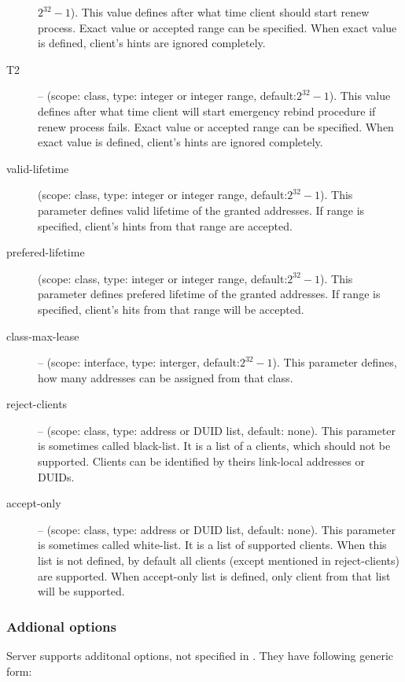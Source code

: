 \begin{description}
            $2^{32}-1$). This value
	    defines after what time client should start renew
	    process. Exact value or accepted range can be
            specified. When exact value is defined, client's hints are
            ignored completely. 
 \item[T2] -- (scope: class, type: integer or integer range, default:$2^{32}-1$). This value
	    defines after what time client will start emergency rebind
	    procedure if renew process fails. Exact value or accepted range can be
            specified. When exact value is defined, client's hints are
            ignored completely.
\item[valid-lifetime] (scope: class, type: integer or integer range,
	    default:$2^{32}-1$). This parameter defines valid lifetime of
	    the granted addresses. If range is specified, client's
            hints from that range are accepted.
\item[prefered-lifetime] (scope: class, type: integer or integer range,
	    default:$2^{32}-1$). This parameter defines prefered
            lifetime of the granted addresses. If range is specified,
            client's hits from that range will be accepted.
\item[class-max-lease]  -- (scope: interface, type: interger,
            default:$2^{32}-1$). This parameter defines, how many
            addresses can be assigned from that class.
\item[reject-clients] -- (scope: class, type: address or DUID list,
            default: none). This parameter is sometimes called
            black-list. It is a list of a clients, which should not be
            supported. Clients can be identified by theirs link-local
            addresses or DUIDs.
\item[accept-only] -- (scope: class, type: address or DUID list,
            default: none). This parameter is sometimes called
            white-list. It is a list of supported clients. When this
            list is not defined, by default all clients (except
            mentioned in reject-clients) are supported. When
            accept-only list is defined, only client from that list
            will be supported.
\end{description}

\subsubsection{Addional options}
Server supports additonal options, not specified in \cite{rfc3315}. They have
following generic form:

